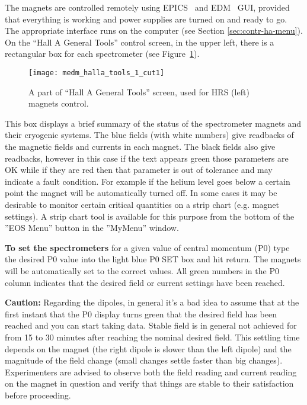 { The magnets are controlled remotely using EPICS~\cite{EPICSwww} and
 EDM~\cite{EDMwww} GUI, provided that everything is working and power 
 supplies are turned on and ready to go.
 The appropriate interface runs
 on the computer  (see Section \ref{sec:contr-ha-menu}).
 On the ``Hall A General Tools'' control screen, in the upper left, there is 
 a rectangular box for each spectrometer (see Figure~\ref{fig:hrs_mag_cntrl}). 
\begin{figure}
\begin{center}
\texttt{[image: medm\_halla\_tools\_1\_cut1]}
{\linespread{1.}
\caption[HRS: Magnets control]{A part of ``Hall A General Tools'' screen, 
        used for HRS (left) magnets control.}
\label{fig:hrs_mag_cntrl}}
\end{center}
\end{figure}

This box displays a brief summary of the status of the spectrometer
magnets and their cryogenic systems. The blue fields (with white
numbers) give readbacks of the magnetic fields and currents in each
magnet. The black fields also give readbacks, however in this case if
the text appears green those parameters are OK while if they are red
then that parameter is out of tolerance and may indicate a fault
condition. For example if the helium level goes below a certain point
the magnet will be automatically turned off.  In some cases it may be
desirable to monitor certain critical quantities on a strip chart
(e.g. magnet settings). A strip chart tool is available for this
purpose from the bottom of the ''EOS Menu'' button in the ''MyMenu'' window.

{\bf To set the spectrometers} for a given value of central momentum
(P0) type the desired P0 value into the light blue P0 SET box and hit
return. The magnets will be automatically 
set to the correct
values. All green numbers in the P0 column indicates that the desired
field or current settings have been reached. 

{\bf Caution:} Regarding the
dipoles, in general it's a bad idea to assume that at the first
instant that the P0 display turns green that the desired field has
been reached and you can start taking data. Stable field is in general
not achieved for from 15 to 30 minutes after reaching the nominal
desired field. This settling time depends on the magnet (the right dipole is
slower than the left dipole) and the magnitude of the field change (small
changes settle faster than big changes). Experimenters are advised to
observe both the field reading and current reading on the magnet in
question and verify that things are stable to their satisfaction
before proceeding.
 
}
